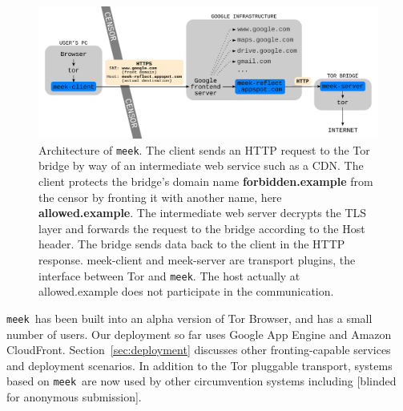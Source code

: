 \documentclass[conference]{IEEEtran}
\newcommand{\meekclient}{\mbox{meek-client}\xspace}
\newcommand{\meekserver}{\mbox{meek-server}\xspace}
\newcommand{\meek}{\texttt{meek}\xspace}
\def\urll#1{\begin{NoHyper}\url{#1}\end{NoHyper}}
\begin{document}
\begin{figure}
\centering
\includegraphics[width=\linewidth]{architecture}
\caption{
Architecture of \meek.
The client sends an HTTP request to the Tor bridge by way of an intermediate web service such as a CDN.
The client protects the bridge's domain name \textbf{forbidden.example} from the censor
by fronting it with another name, here \textbf{allowed.example}.
The intermediate web server decrypts the TLS layer and forwards the request to the bridge
according to the Host header.
The bridge sends data back to the client in the HTTP response.
\meekclient and \meekserver are transport plugins, the interface between Tor and \meek.
The host actually at allowed.example does not participate in the communication.
}
\label{fig:architecture}
\end{figure}

\meek\ has been built into an alpha version of Tor Browser,
and has a small number of users.
Our deployment so far uses Google App Engine and Amazon CloudFront.
Section~\ref{sec:deployment} discusses other fronting-capable services
and deployment scenarios.
In addition to the Tor pluggable transport,
systems based on \meek\ are now used by other circumvention systems including
[blinded for anonymous submission].

\end{document}
